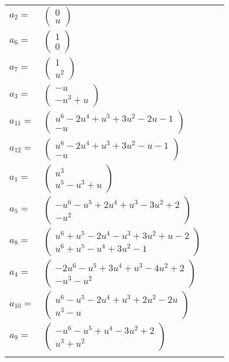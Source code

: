 \documentclass[1p]{elsarticle_modified}
\theoremstyle{definition}
\begin{document}
\begin{tabular}{m{7pt} m{180pt} m{7pt} m{180pt} }
\flushright $a_{2}=$&$\begin{pmatrix}0\\u\end{pmatrix}$ \\
\flushright $a_{6}=$&$\begin{pmatrix}1\\0\end{pmatrix}$ \\
\flushright $a_{7}=$&$\begin{pmatrix}1\\u^2\end{pmatrix}$ \\
\flushright $a_{3}=$&$\begin{pmatrix}- u\\- u^3+u\end{pmatrix}$ \\
\flushright $a_{11}=$&$\begin{pmatrix}u^6-2 u^4+u^3+3 u^2-2 u-1\\- u\end{pmatrix}$ \\
\flushright $a_{12}=$&$\begin{pmatrix}u^6-2 u^4+u^3+3 u^2- u-1\\- u\end{pmatrix}$ \\
\flushright $a_{1}=$&$\begin{pmatrix}u^3\\u^5- u^3+u\end{pmatrix}$ \\
\flushright $a_{5}=$&$\begin{pmatrix}- u^6- u^5+2 u^4+u^3-3 u^2+2\\- u^2\end{pmatrix}$ \\
\flushright $a_{8}=$&$\begin{pmatrix}u^6+u^5-2 u^4- u^3+3 u^2+u-2\\u^6+u^5- u^4+3 u^2-1\end{pmatrix}$ \\
\flushright $a_{4}=$&$\begin{pmatrix}-2 u^6- u^5+3 u^4+u^3-4 u^2+2\\- u^3- u^2\end{pmatrix}$ \\
\flushright $a_{10}=$&$\begin{pmatrix}u^6- u^5-2 u^4+u^3+2 u^2-2 u\\u^3- u\end{pmatrix}$ \\
\flushright $a_{9}=$&$\begin{pmatrix}- u^6- u^5+u^4-3 u^2+2\\u^3+u^2\end{pmatrix}$\\&\end{tabular}
\end{document}
